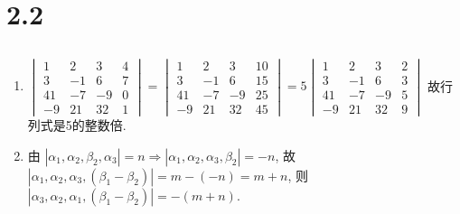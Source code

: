 \section{2.2}


\subsection{} %


	\paragraph{} %
		\begin{enumerate}
			\item %
			      $\begin{vmatrix}
					      1  & 2  & 3  & 4 \\
					      3  & -1 & 6  & 7 \\
					      41 & -7 & -9 & 0 \\
					      -9 & 21 & 32 & 1
				      \end{vmatrix} = \begin{vmatrix}
					      1  & 2  & 3  & 10 \\
					      3  & -1 & 6  & 15 \\
					      41 & -7 & -9 & 25 \\
					      -9 & 21 & 32 & 45
				      \end{vmatrix} = 5\begin{vmatrix}
					      1  & 2  & 3  & 2 \\
					      3  & -1 & 6  & 3 \\
					      41 & -7 & -9 & 5 \\
					      -9 & 21 & 32 & 9
				      \end{vmatrix}$
			      故行列式是5的整数倍.

			\item %
			      由 $|\alpha_1, \alpha_2, \beta_2, \alpha_3| = n \Rightarrow |\alpha_1, \alpha_2, \alpha_3, \beta_2| = -n$,
			      故 $|\alpha_1, \alpha_2, \alpha_3, (\beta_1 - \beta_2)| = m - (-n) = m + n$,
			      则 $|\alpha_3, \alpha_2, \alpha_1, (\beta_1 - \beta_2)| = -(m + n)$.
		\end{enumerate}


